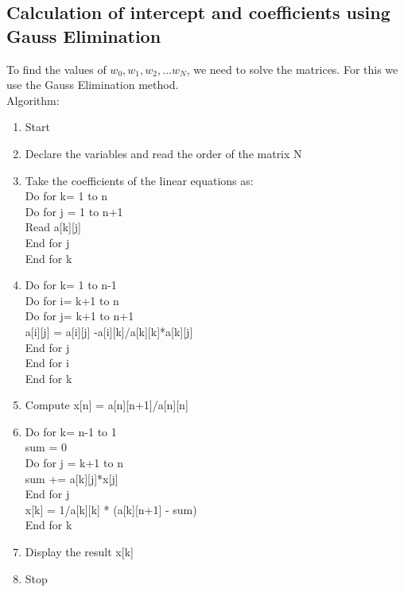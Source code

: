 \subsection{ Calculation of intercept and coefficients using Gauss Elimination}
\vspace{-18pt}
To find the values of $w_{0},w_{1},w_{2},...w_{N}$, we need to solve the matrices. For this we use the Gauss Elimination method.\\
Algorithm:
\vspace{-18pt}
\begin{enumerate}
\item Start
\item Declare the variables and read the order of the matrix N
\item Take the coefficients of the linear equations as:\\
Do for k= 1 to n\\
Do for j = 1 to n+1\\
Read a[k][j]\\
End for j\\
End for k
\item Do for k= 1 to n-1\\
Do for i= k+1 to n\\
Do for j= k+1 to n+1\\
a[i][j] = a[i][j] -a[i][k]/a[k][k]*a[k][j]\\
End for j\\
End for i\\
End for k
\item Compute x[n] = a[n][n+1]/a[n][n]
\item Do for k= n-1 to 1\\
sum = 0\\
Do for j = k+1 to n\\
sum += a[k][j]*x[j]\\
End for j\\
x[k] = 1/a[k][k] * (a[k][n+1] - sum)\\
End for k
\item Display the result x[k]
\item Stop 
\end{enumerate}
